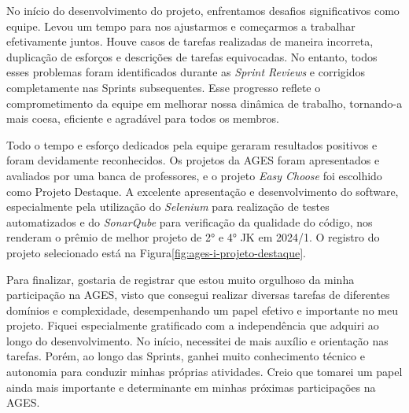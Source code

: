 \indent \originaltab{}No início do desenvolvimento do projeto, enfrentamos desafios significativos como equipe. Levou um tempo para nos ajustarmos e começarmos a trabalhar efetivamente juntos. Houve casos de tarefas realizadas de maneira incorreta, duplicação de esforços e descrições de tarefas equivocadas. No entanto, todos esses problemas foram identificados durante as \textit{Sprint Reviews }e corrigidos completamente nas Sprints subsequentes. Esse progresso reflete o comprometimento da equipe em melhorar nossa dinâmica de trabalho, tornando-a mais coesa, eficiente e agradável para todos os membros.

\indent \originaltab{}Todo o tempo e esforço dedicados pela equipe geraram resultados positivos e foram devidamente reconhecidos. Os projetos da AGES foram apresentados e avaliados por uma banca de professores, e o projeto \textit{Easy Choose} foi escolhido como Projeto Destaque. A excelente apresentação e desenvolvimento do software, especialmente pela utilização do \textit{Selenium} para realização de testes automatizados e do \textit{SonarQube} para verificação da qualidade do código, nos renderam o prêmio de melhor projeto de 2° e 4° JK em 2024/1. O registro do projeto selecionado está na Figura\hspace{0.6em}\hyperref[fig:ages-i-projeto-destaque]{\ref*{fig:ages-i-projeto-destaque}}.

\indent \originaltab{}Para finalizar, gostaria de registrar que estou muito orgulhoso da minha participação na AGES, visto que consegui realizar diversas tarefas de diferentes domínios e complexidade, desempenhando um papel efetivo e importante no meu projeto. Fiquei especialmente gratificado com a independência que adquiri ao longo do desenvolvimento. No início, necessitei de mais auxílio e orientação nas tarefas. Porém, ao longo das Sprints, ganhei muito conhecimento técnico e autonomia para conduzir minhas próprias atividades. Creio que tomarei um papel ainda mais importante e determinante em minhas próximas participações na AGES.

